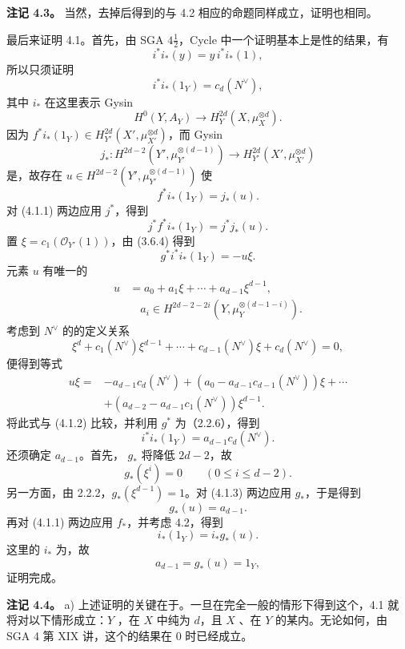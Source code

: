 \textbf{注记 4.3。} 当然，去掉后得到的与 4.2 相应的命题同样成立，证明也相同。

最后来证明 4.1。首先，由 SGA $4\frac12$，Cycle 中一个证明基本上是性的结果，有
\[
 i^*i_*(y)=y\,i^*i_*(1),
\]
所以只须证明
\[
 i^*i_*(1_Y)=c_d(N^\vee),
\]
其中 $i_*$ 在这里表示 Gysin 
\[
 H^0(Y,A_Y)\longrightarrow H_Y^{2d}(X,\mu_X^{\otimes d}).
\]
因为 $f^*i_*(1_Y)\in H_{Y'}^{2d}(X',\mu_{X'}^{\otimes d})$，而 Gysin 
\[
 j_*:H^{2d-2}(Y',\mu_{Y'}^{\otimes(d-1)})\longrightarrow H_{Y'}^{2d}(X',\mu_{X'}^{\otimes d})
\]
是，故存在 $u\in H^{2d-2}(Y',\mu_{Y'}^{\otimes(d-1)})$ 使
\[
 f^*i_*(1_Y)=j_*(u).\tag{4.1.1}
\]
对 (4.1.1) 两边应用 $j^*$，得到
\[
 j^*f^*i_*(1_Y)=j^*j_*(u).
\]
置 $\xi=c_1(\mathscr O_{Y'}(1))$，由 (3.6.4) 得到
\[
 g^*i^*i_*(1_Y)=-u\xi.\tag{4.1.2}
\]
元素 $u$ 有唯一的
\[
 \begin{split}
 u&=a_0+a_1\xi+\cdots+a_{d-1}\xi^{d-1},\\
 &\hspace{1em}a_i\in H^{2d-2-2i}(Y,\mu_Y^{\otimes(d-1-i)}).
 \end{split}\tag{4.1.3}
\]
考虑到 $N^\vee$ 的的定义关系
\[
 \xi^d+c_1(N^\vee)\xi^{d-1}+\cdots+c_{d-1}(N^\vee)\xi+c_d(N^\vee)=0,\tag{4.1.4}
\]
便得到等式
\[
 \begin{split}
 u\xi={}&-a_{d-1}c_d(N^\vee)
 +(a_0-a_{d-1}c_{d-1}(N^\vee))\xi+\cdots\\
 &+(a_{d-2}-a_{d-1}c_1(N^\vee))\xi^{d-1}.
 \end{split}
\]
将此式与 (4.1.2) 比较，并利用 $g^*$ 为（2.2.6），得到
\[
 i^*i_*(1_Y)=a_{d-1}c_d(N^\vee).\tag{4.1.5}
\]
还须确定 $a_{d-1}$。首先， $g_*$ 将降低 $2d-2$，故
\[
 g_*(\xi^i)=0\qquad(0\le i\le d-2).
\]
另一方面，由 2.2.2，$g_*(\xi^{d-1})=1$。对 (4.1.3) 两边应用 $g_*$，于是得到
\[
 g_*(u)=a_{d-1}.\tag{4.1.6}
\]
再对 (4.1.1) 两边应用 $f_*$，并考虑 4.2，得到
\[
 i_*(1_Y)=i_*g_*(u).\tag{4.1.7}
\]
这里的 $i_*$ 为，故
\[
 a_{d-1}=g_*(u)=1_Y,
\]
证明完成。

\textbf{注记 4.4。} a) 上述证明的关键在于。一旦在完全一般的情形下得到这个，4.1 就将对以下情形成立：$Y$ ，在 $X$ 中纯为 $d$，且 $X$ 、在 $Y$ 的某内。无论如何，由 SGA 4 第 XIX 讲，这个的结果在 $0$ 时已经成立。

